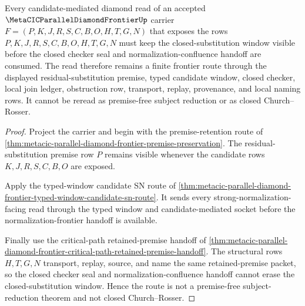 \begin{theorem}
\label{thm:metacic-parallel-diamond-frontier-closed-substitution-window-scope}
Every candidate-mediated diamond read of an accepted $\MetaCICParallelDiamondFrontierUp$ carrier $F=(P,K,J,R,S,C,B,O,H,T,G,N)$ that exposes the rows $P,K,J,R,S,C,B,O,H,T,G,N$ must keep the closed-substitution window visible before the closed checker seal and normalization-confluence handoff are consumed. The read therefore remains a finite frontier route through the displayed residual-substitution premise, typed candidate window, closed checker, local join ledger, obstruction row, transport, replay, provenance, and local naming rows. It cannot be reread as premise-free subject reduction or as closed Church--Rosser.
\end{theorem}
\begin{proof}
Project the carrier and begin with the premise-retention route of \autoref{thm:metacic-parallel-diamond-frontier-premise-preservation}. The residual-substitution premise row $P$ remains visible whenever the candidate rows $K,J,R,S,C,B,O$ are exposed.

Apply the typed-window candidate SN route of \autoref{thm:metacic-parallel-diamond-frontier-typed-window-candidate-sn-route}. It sends every strong-normalization-facing read through the typed window and candidate-mediated socket before the normalization-frontier handoff is available.

Finally use the critical-path retained-premise handoff of \autoref{thm:metacic-parallel-diamond-frontier-critical-path-retained-premise-handoff}. The structural rows $H,T,G,N$ transport, replay, source, and name the same retained-premise packet, so the closed checker seal and normalization-confluence handoff cannot erase the closed-substitution window. Hence the route is not a premise-free subject-reduction theorem and not closed Church--Rosser.
\end{proof}

